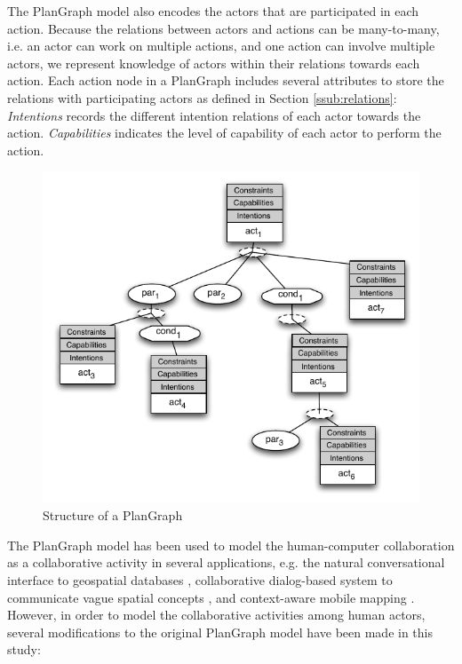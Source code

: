 The PlanGraph model also encodes the actors that are participated in each action. Because the relations between actors and actions can be many-to-many, i.e. an actor can work on multiple actions, and one action can involve multiple actors, we represent knowledge of actors within their relations towards each action. Each action node in a PlanGraph includes several attributes to store the relations with participating actors as defined in Section \ref{ssub:relations}: \emph{Intentions} records the different intention relations of each actor towards the action. \emph{Capabilities} indicates the level of capability of each actor to perform the action.

\begin{figure}[htbp] %
   \centering
   \includegraphics{plangraph.pdf} 
   \caption{Structure of a PlanGraph}
   \label{fig:plangraph}
\end{figure}

The PlanGraph model has been used to model the human-computer collaboration as a collaborative activity in several applications, e.g. the natural conversational interface to geospatial databases \cite{Cai2005}, collaborative dialog-based system to communicate vague spatial concepts \cite{Cai2003}, and context-aware mobile mapping \cite{yu2010using}. However, in order to model the collaborative activities among human actors, several modifications to the original PlanGraph model have been made in this study:

